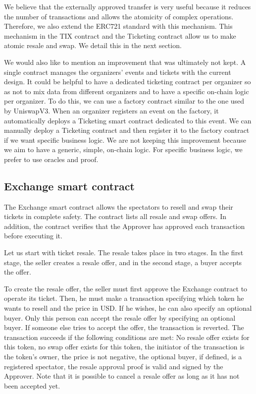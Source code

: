 \documentclass[a4paper,11pt,oneside]{report}
\begin{document}
We believe that the externally approved transfer is very useful because it reduces the number of transactions and allows the atomicity of complex operations. Therefore, we also extend the ERC721 standard with this mechanism. This mechanism in the TIX contract and the Ticketing contract allow us to make atomic resale and swap. We detail this in the next section.

We would also like to mention an improvement that was ultimately not kept. A single contract manages the organizers' events and tickets with the current design. It could be helpful to have a dedicated ticketing contract per organizer so as not to mix data from different organizers and to have a specific on-chain logic per organizer. To do this, we can use a factory contract similar to the one used by UniswapV3. When an organizer registers an event on the factory, it automatically deploys a Ticketing smart contract dedicated to this event. We can manually deploy a Ticketing contract and then register it to the factory contract if we want specific business logic. We are not keeping this improvement because we aim to have a generic, simple, on-chain logic. For specific business logic, we prefer to use oracles and proof.

\subsection{Exchange smart contract}
The Exchange smart contract allows the spectators to resell and swap their tickets in complete safety. The contract lists all resale and swap offers. In addition, the contract verifies that the Approver has approved each transaction before executing it.

Let us start with ticket resale. The resale takes place in two stages. In the first stage, the seller creates a resale offer, and in the second stage, a buyer accepts the offer.

To create the resale offer, the seller must first approve the Exchange contract to operate its ticket. Then, he must make a transaction specifying which token he wants to resell and the price in USD. If he wishes, he can also specify an optional buyer. Only this person can accept the resale offer by specifying an optional buyer. If someone else tries to accept the offer, the transaction is reverted. The transaction succeeds if the following conditions are met: No resale offer exists for this token, no swap offer exists for this token, the initiator of the transaction is the token's owner, the price is not negative, the optional buyer, if defined, is a registered spectator, the resale approval proof is valid and signed by the Approver. Note that it is possible to cancel a resale offer as long as it has not been accepted yet.
\end{document}
